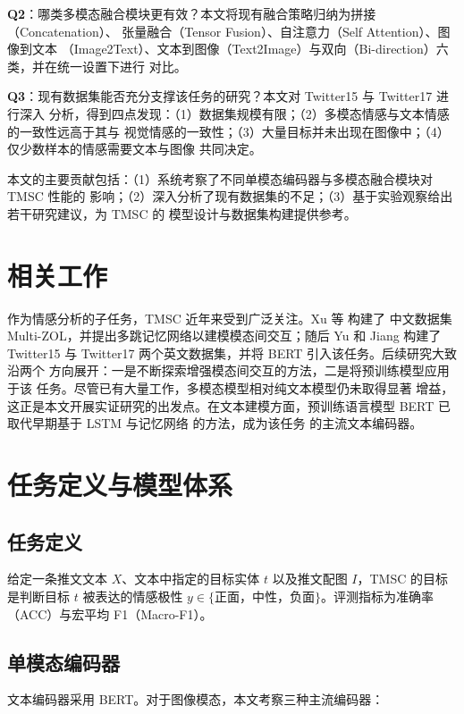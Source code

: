 \documentclass[12pt]{ctexart}
\begin{document}
\textbf{Q2}：哪类多模态融合模块更有效？本文将现有融合策略归纳为拼接（Concatenation）、
张量融合（Tensor Fusion）\cite{zadeh2017}、自注意力（Self Attention）、图像到文本
（Image2Text）、文本到图像（Text2Image）与双向（Bi-direction）六类，并在统一设置下进行
对比。

\textbf{Q3}：现有数据集能否充分支撑该任务的研究？本文对 Twitter15 与 Twitter17 进行深入
分析，得到四点发现：（1）数据集规模有限；（2）多模态情感与文本情感的一致性远高于其与
视觉情感的一致性；（3）大量目标并未出现在图像中；（4）仅少数样本的情感需要文本与图像
共同决定\cite{ye2023}。

本文的主要贡献包括：（1）系统考察了不同单模态编码器与多模态融合模块对 TMSC 性能的
影响；（2）深入分析了现有数据集的不足；（3）基于实验观察给出若干研究建议，为 TMSC 的
模型设计与数据集构建提供参考\cite{ye2023}。

\clearpage
\section{相关工作}
作为情感分析的子任务，TMSC 近年来受到广泛关注\cite{yu2019}。Xu 等\cite{xu2019} 构建了
中文数据集 Multi-ZOL，并提出多跳记忆网络以建模模态间交互；随后 Yu 和 Jiang\cite{yu2019}
构建了 Twitter15 与 Twitter17 两个英文数据集，并将 BERT 引入该任务。后续研究大致沿两个
方向展开：一是不断探索增强模态间交互的方法\cite{khan2021}，二是将预训练模型应用于该
任务\cite{smp2022,vlp2022}。尽管已有大量工作，多模态模型相对纯文本模型仍未取得显著
增益，这正是本文开展实证研究的出发点。在文本建模方面，预训练语言模型 BERT\cite{devlin2019}
已取代早期基于 LSTM\cite{hochreiter1997} 与记忆网络\cite{weston2015} 的方法，成为该任务
的主流文本编码器。

\clearpage
\section{任务定义与模型体系}
\subsection{任务定义}
给定一条推文文本 $X$、文本中指定的目标实体 $t$ 以及推文配图 $I$，TMSC 的目标是判断目标
$t$ 被表达的情感极性 $y\in\{\text{正面，中性，负面}\}$。评测指标为准确率（ACC）与宏平均
F1（Macro-F1）\cite{ye2023}。

\subsection{单模态编码器}
文本编码器采用 BERT\cite{devlin2019}。对于图像模态，本文考察三种主流编码器：
\end{document}
